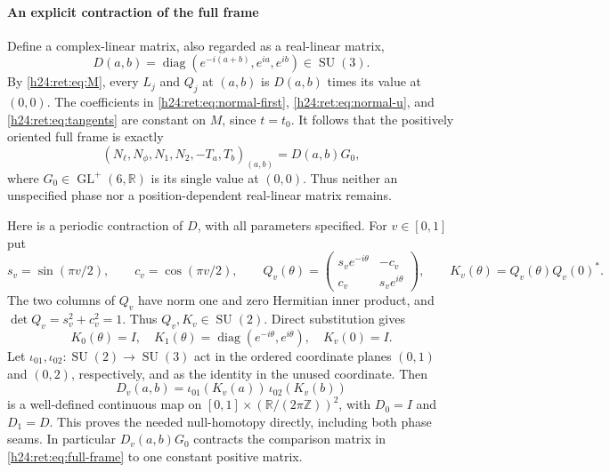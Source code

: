 \paragraph{An explicit contraction of the full frame}

Define a complex-linear matrix, also regarded as a real-linear matrix,
\begin{equation}
 D(a,b)=\operatorname{diag}(e^{-i(a+b)},e^{ia},e^{ib})\in\operatorname{SU}(3).
 \label{h24:ret:eq:D}
\end{equation}
By \eqref{h24:ret:eq:M}, every \(L_j\) and \(Q_j\) at \((a,b)\) is
\(D(a,b)\) times its value at \((0,0)\).  The coefficients in
\eqref{h24:ret:eq:normal-first}, \eqref{h24:ret:eq:normal-u}, and
\eqref{h24:ret:eq:tangents} are constant on \(M\), since \(t=t_0\).
It follows that the positively oriented full frame is exactly
\begin{equation}
 (N_\ell,N_\phi,N_1,N_2,-T_a,T_b)_{(a,b)}
       =D(a,b)G_0,
 \label{h24:ret:eq:full-frame}
\end{equation}
where \(G_0\in\operatorname{GL}^+(6,\mathbb R)\) is its single value at \((0,0)\).
Thus neither an unspecified phase nor a position-dependent
real-linear matrix remains.

Here is a periodic contraction of \(D\), with all parameters
specified.  For \(v\in[0,1]\) put
\[
 s_v=\sin(\pi v/2),\qquad c_v=\cos(\pi v/2),\qquad
 Q_v(\theta)=
 \begin{pmatrix}s_ve^{-i\theta}&-c_v\\c_v&s_ve^{i\theta}\end{pmatrix},
 \qquad K_v(\theta)=Q_v(\theta)Q_v(0)^*.
\]
The two columns of \(Q_v\) have norm one and zero Hermitian inner
product, and \(\det Q_v=s_v^2+c_v^2=1\).  Thus
\(Q_v,K_v\in\operatorname{SU}(2)\).  Direct substitution gives
\[
 K_0(\theta)=I,\quad
 K_1(\theta)=\operatorname{diag}(e^{-i\theta},e^{i\theta}),\quad
 K_v(0)=I.
\]
Let \(\iota_{01},\iota_{02}:\operatorname{SU}(2)\to\operatorname{SU}(3)\) act in the
ordered coordinate planes \((0,1)\) and \((0,2)\), respectively,
and as the identity in the unused coordinate.  Then
\begin{equation}
 D_v(a,b)=\iota_{01}(K_v(a))\,\iota_{02}(K_v(b))
 \label{h24:ret:eq:D-homotopy}
\end{equation}
is a well-defined continuous map on
\([0,1]\times(\mathbb R/(2\pi\mathbb Z))^2\), with
\(D_0=I\) and \(D_1=D\).  This proves the needed null-homotopy
directly, including both phase seams.  In particular
\(D_v(a,b)G_0\) contracts the comparison matrix in
\eqref{h24:ret:eq:full-frame} to one constant positive matrix.

